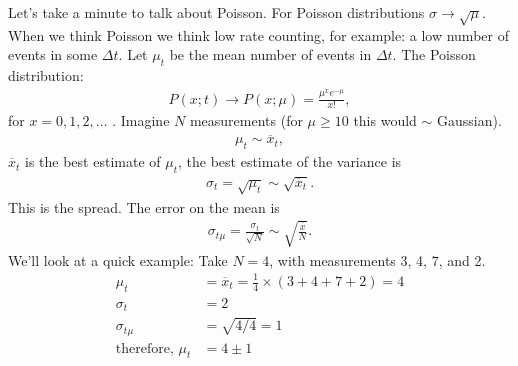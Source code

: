 \documentclass{article}
\begin{document}
Let's take a minute to talk about Poisson. For Poisson distributions $\sigma \rightarrow \sqrt{\mu}$. When we think Poisson we think low rate counting, for example: a low number of events in some $\Delta t$. Let $\mu_t$ be the mean number of events in $\Delta t$. The Poisson distribution:
\begin{align}
  P(x;t) \rightarrow P(x;\mu) = \frac{\mu^xe^{-\mu}}{x!},
\end{align}
for $x = 0, 1, 2,...$ . Imagine $N$ measurements (for $\mu \geq 10$ this would $\sim$ Gaussian).
\begin{align}
  \mu_t \sim \overline{x}_t,
\end{align}
$\overline{x}_t$ is the best estimate of $\mu_t$, the best estimate of the variance is
\begin{align}
  \sigma_t = \sqrt{\mu_t} \sim \sqrt{\overline{x}_t}.
\end{align}
This is the spread. The error on the mean is
\begin{align}
  \sigma_{t\mu} = \frac{\sigma_t}{\sqrt{N}} \sim \sqrt{\frac{\overline{x}}{N}}.
\end{align}
We'll look at a quick example: Take $N = 4$, with measurements 3, 4, 7, and 2.
\begin{align*}
  \mu_t                    & = \overline{x}_t = \frac{1}{4}\times(3 + 4 + 7 + 2) = 4              \\
  \sigma_t                 & = 2                                                                  \\
  \sigma_{t\mu}            & = \sqrt{4/4} = 1                                                     \\
  \text{therefore, } \mu_t & = 4 \pm 1
\end{align*}
\end{document}
